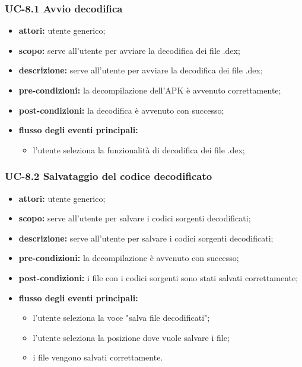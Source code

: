 \subsubsection{UC-8.1 Avvio decodifica}
\begin{itemize}
    \item \textbf{attori:} utente generico;
    \item \textbf{scopo:} serve all'utente per avviare la decodifica dei file .dex;
    \item \textbf{descrizione:} serve all'utente per avviare la decodifica dei file .dex;
    \item \textbf{pre-condizioni:} la decompilazione dell'APK è avvenuto correttamente;
    \item \textbf{post-condizioni:} la decodifica è avvenuto con successo;
    \item \textbf{flusso degli eventi principali:}
    \begin{itemize}
        \item l'utente seleziona la funzionalità di decodifica dei file .dex;
    \end{itemize}
\end{itemize}
\subsubsection{UC-8.2 Salvataggio del codice decodificato}
\begin{itemize}
    \item \textbf{attori:} utente generico;
    \item \textbf{scopo:} serve all'utente per salvare i codici sorgenti decodificati;
    \item \textbf{descrizione:} serve all'utente per salvare i codici sorgenti decodificati;
    \item \textbf{pre-condizioni:} la decompilazione è avvenuto con successo;
    \item \textbf{post-condizioni:} i file con i codici sorgenti sono stati salvati correttamente;
    \item \textbf{flusso degli eventi principali:}
    \begin{itemize}
        \item l'utente seleziona la voce "salva file decodificati";
        \item l'utente seleziona la posizione dove vuole salvare i file;
        \item i file vengono salvati correttamente.
    \end{itemize}
\end{itemize}

